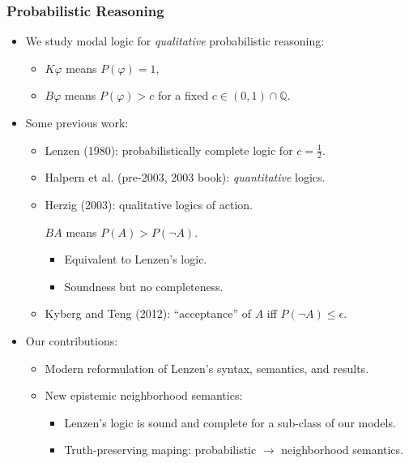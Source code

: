 \begin{frame}
  \frametitle{Probabilistic Reasoning}

  \begin{itemize}
  \item<+-> We study modal logic for \emph{qualitative} probabilistic
    reasoning:
    \begin{itemize}
    \item $K\varphi$ means $P(\varphi)=1$,

    \item $B\varphi$ means $P(\varphi)>c$ for a fixed
      $c\in(0,1)\cap\mathbb{Q}$.
    \end{itemize}

  \item<+-> Some previous work:
    \begin{itemize}
    \item<+-> Lenzen (1980): probabilistically complete logic for
      $c=\frac 12$.

    \item<+-> Halpern et al. (pre-2003, 2003 book):
      \emph{quantitative} logics.

    \item<+-> Herzig (2003): qualitative logics of action.
      \begin{center}
        $BA$ means $P(A)>P(\lnot A)$.
      \end{center}
      \begin{itemize}
      \item Equivalent to Lenzen's logic.

      \item Soundness but no completeness.
      \end{itemize}
      
    \item<+-> Kyberg and Teng (2012): ``acceptance'' of $A$ iff
      $P(\lnot A)\leq\epsilon$.
    \end{itemize}

  \item<+-> Our contributions:
    \begin{itemize}
    \item Modern reformulation of Lenzen's syntax, semantics, and
      results.

    \item New epistemic neighborhood semantics:
      \begin{itemize}
      \item Lenzen's logic is sound and complete for a sub-class
        of our models.

      \item Truth-preserving maping: probabilistic $\to$ neighborhood
        semantics.
      \end{itemize}
    \end{itemize}
  \end{itemize}
\end{frame}

